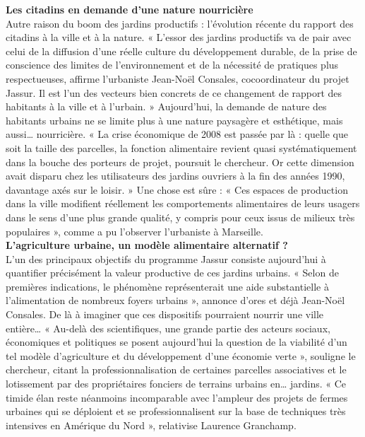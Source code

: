 \documentclass[8pt]{article}
\begin{document}
\textbf{Les citadins en demande d’une nature nourricière}\\

Autre raison du boom des jardins productifs : l’évolution récente du rapport des citadins à la ville et à la nature. « L’essor des jardins productifs va de pair avec celui de la diffusion d’une réelle culture du développement durable, de la prise de conscience des limites de l’environnement et de la nécessité de pratiques plus respectueuses, affirme l’urbaniste Jean-Noël Consales, cocoordinateur du projet Jassur. Il est l’un des vecteurs bien concrets de ce changement de rapport des habitants à la ville et à l’urbain. » Aujourd’hui, la demande de nature des habitants urbains ne se limite plus à une nature paysagère et esthétique, mais aussi… nourricière. « La crise économique de 2008 est passée par là : quelle que soit la taille des parcelles, la fonction alimentaire revient quasi systématiquement dans la bouche des porteurs de projet, poursuit le chercheur. Or cette dimension avait disparu chez les utilisateurs des jardins ouvriers à la fin des années 1990, davantage axés sur le loisir. » Une chose est sûre : « Ces espaces de production dans la ville modifient réellement les comportements alimentaires de leurs usagers dans le sens d’une plus grande qualité, y compris pour ceux issus de milieux très populaires », comme a pu l’observer l’urbaniste à Marseille.\\

\textbf{L’agriculture urbaine, un modèle alimentaire alternatif ?}\\

L’un des principaux objectifs du programme Jassur consiste aujourd’hui à quantifier précisément la valeur productive de ces jardins urbains. « Selon de premières indications, le phénomène représenterait une aide substantielle à l’alimentation de nombreux foyers urbains », annonce d’ores et déjà Jean-Noël Consales. De là à imaginer que ces dispositifs pourraient nourrir une ville entière… « Au-delà des scientifiques, une grande partie des acteurs sociaux, économiques et politiques se posent aujourd’hui la question de la viabilité d’un tel modèle d’agriculture et du développement d’une économie verte », souligne le chercheur, citant la professionnalisation de certaines parcelles associatives et le lotissement par des propriétaires fonciers de terrains urbains en… jardins. « Ce timide élan reste néanmoins incomparable avec l’ampleur des projets de fermes urbaines qui se déploient et se professionnalisent sur la base de techniques très intensives en Amérique du Nord », relativise Laurence Granchamp.\\
\end{document}
